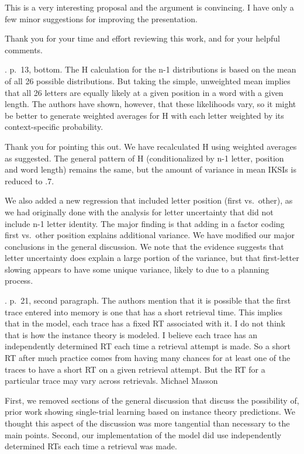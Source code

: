 \documentclass[draft]{article}
\begin{document}
\RC This is a very interesting proposal and the argument is convincing. I have only a few minor suggestions for improving the presentation.

Thank you for your time and effort reviewing this work, and for your helpful comments.

. p.~13, bottom. The H calculation for the n-1 distributions is based on the mean of all 26 possible distributions. But taking the simple, unweighted mean implies that all 26 letters are equally likely at a given position in a word with a given length. The authors have shown, however, that these likelihoods vary, so it might be better to generate weighted averages for H with each letter weighted by its context-specific probability.

Thank you for pointing this out. We have recalculated H using weighted averages as suggested. The general pattern of H (conditionalized by n-1 letter, position and word length) remains the same, but the amount of variance in mean IKSIs is reduced to .7.

We also added a new regression that included letter position (first vs.~other), as we had originally done with the analysis for letter uncertainty that did not include n-1 letter identity. The major finding is that adding in a factor coding first vs.~other position explains additional variance. We have modified our major conclusions in the general discussion. We note that the evidence suggests that letter uncertainty does explain a large portion of the variance, but that first-letter slowing appears to have some unique variance, likely to due to a planning process.

. p.~21, second paragraph. The authors mention that it is possible that the first trace entered into memory is one that has a short retrieval time. This implies that in the model, each trace has a fixed RT associated with it. I do not think that is how the instance theory is modeled. I believe each trace has an independently determined RT each time a retrieval attempt is made. So a short RT after much practice comes from having many chances for at least one of the traces to have a short RT on a given retrieval attempt. But the RT for a particular trace may vary across retrievals. Michael Masson

First, we removed sections of the general discussion that discuss the possibility of, prior work showing single-trial learning based on instance theory predictions. We thought this aspect of the discussion was more tangential than necessary to the main points. Second, our implementation of the model did use independently determined RTs each time a retrieval was made.

\setlength{\leftskip}{0.4in}
\setlength{\parindent}{-0.4in}
\end{document}
